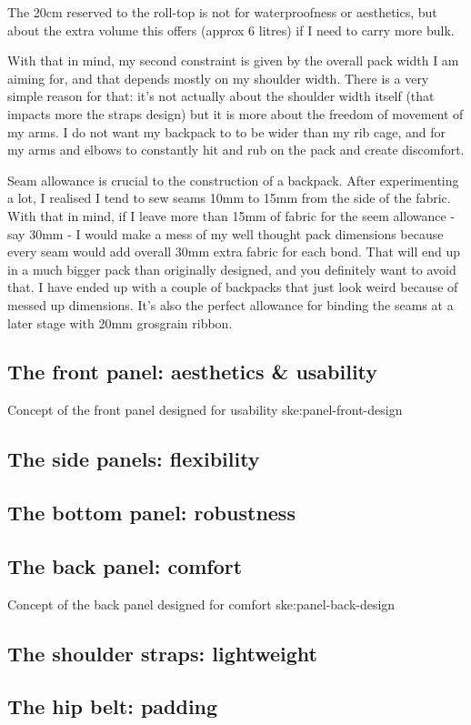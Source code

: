 \begin{note}
  The 20cm reserved to the roll-top is not for waterproofness or aesthetics, but about the extra volume this offers (approx 6 litres) if I need to carry more bulk.
\end{note}

With that in mind, my second constraint is given by the overall pack width I am aiming for, and that depends mostly on my shoulder width. There is a very simple reason for that: it's not actually about the shoulder width itself (that impacts more the straps design) but it is more about the freedom of movement of my arms. I do not want my backpack to to be wider than my rib cage, and for my arms and elbows to constantly hit and rub on the pack and create discomfort.

\begin{note}
  Seam allowance is crucial to the construction of a backpack. After experimenting a lot, I realised I tend to sew seams 10mm to 15mm from the side of the fabric. With that in mind, if I leave more than 15mm of fabric for the seem allowance - say 30mm - I would make a mess of my well thought pack dimensions because every seam would add overall 30mm extra fabric for each bond. That will end up in a much bigger pack than originally designed, and you definitely want to avoid that. I have ended up with a couple of backpacks that just look weird because of messed up dimensions. It's also the perfect allowance for binding the seams at a later stage with 20mm grosgrain ribbon.
\end{note}

\subsection{The front panel: aesthetics \& usability}

{Concept of the front panel designed for usability}
{ske:panel-front-design}

\subsection{The side panels: flexibility}
\subsection{The bottom panel: robustness}
\subsection{The back panel: comfort}

{Concept of the back panel designed for comfort}
{ske:panel-back-design}

\subsection{The shoulder straps: lightweight}
\subsection{The hip belt: padding}
